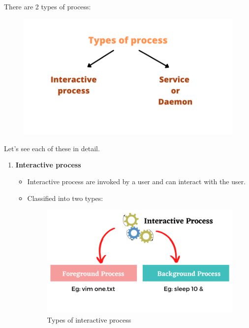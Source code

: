 \setlength{\columnsep}{3pt}
\begin{flushleft}

There are 2 types of process:

\begin{figure}[h!]
	\centering
	\includegraphics[scale=.55]{content/chapter12/images/newp.png}
\end{figure}

Let's see each of these in detail.
\newpage

\begin{enumerate}
	\item \textbf{Interactive process}
	\begin{itemize}
		\item Interactive process are invoked by a user and can interact with the user.
		\item Classified into two types:
		
		\begin{figure}[h!]
			\centering
			\includegraphics[scale=.45]{content/chapter12/images/interactive.png}
			\caption{Types of interactive process}
			\label{fig:type}
		\end{figure}
		

\end{itemize}
\end{enumerate}
\end{flushleft}
